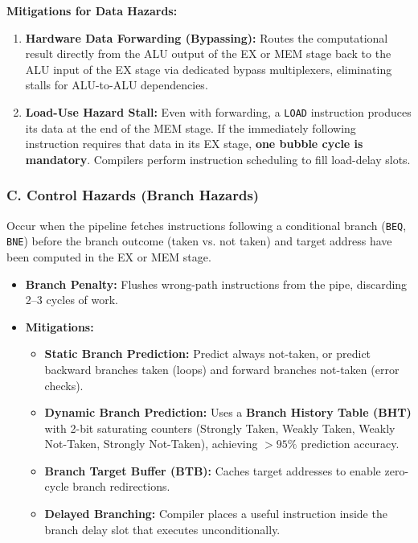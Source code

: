 \textbf{Mitigations for Data Hazards:}
\begin{enumerate}[label=\bfseries\arabic*.]
    \item \textbf{Hardware Data Forwarding (Bypassing):} Routes the computational result directly from the ALU output of the EX or MEM stage back to the ALU input of the EX stage via dedicated bypass multiplexers, eliminating stalls for ALU-to-ALU dependencies.
    \item \textbf{Load-Use Hazard Stall:} Even with forwarding, a \texttt{LOAD} instruction produces its data at the end of the MEM stage. If the immediately following instruction requires that data in its EX stage, \textbf{one bubble cycle is mandatory}. Compilers perform instruction scheduling to fill load-delay slots.
\end{enumerate}

\subsubsection{C. Control Hazards (Branch Hazards)}
Occur when the pipeline fetches instructions following a conditional branch (\texttt{BEQ}, \texttt{BNE}) before the branch outcome (taken vs. not taken) and target address have been computed in the EX or MEM stage.
\begin{itemize}
    \item \textbf{Branch Penalty:} Flushes wrong-path instructions from the pipe, discarding 2--3 cycles of work.
    \item \textbf{Mitigations:}
    \begin{itemize}
        \item \textbf{Static Branch Prediction:} Predict always not-taken, or predict backward branches taken (loops) and forward branches not-taken (error checks).
        \item \textbf{Dynamic Branch Prediction:} Uses a \textbf{Branch History Table (BHT)} with 2-bit saturating counters (Strongly Taken, Weakly Taken, Weakly Not-Taken, Strongly Not-Taken), achieving $>95\%$ prediction accuracy.
        \item \textbf{Branch Target Buffer (BTB):} Caches target addresses to enable zero-cycle branch redirections.
        \item \textbf{Delayed Branching:} Compiler places a useful instruction inside the branch delay slot that executes unconditionally.
    \end{itemize}
\end{itemize}



